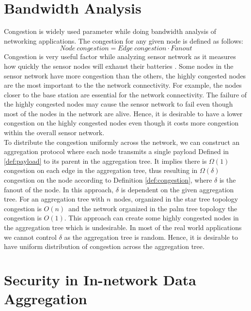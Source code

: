 \section{Bandwidth Analysis}
	Congestion is widely used parameter while doing bandwidth analysis of networking applications. 
	The congestion for any given node is defined as follows:
	\begin{equation}\label{def:congestion}
		Node\ congestion = Edge\ congestion \cdot Fanout
	\end{equation}
	Congestion is very useful factor while analyzing sensor network as it measures how quickly the sensor nodes will exhaust their batteries \cite{madden2003design}. 
	Some nodes in the sensor network have more congestion than the others, the highly congested nodes are the most important to the the network connectivity.
	For example, the nodes closer to the base station are essential for the network connectivity.
	The failure of the highly congested nodes may cause the sensor network to fail even though most of the nodes in the network are alive.
	Hence, it is desirable to have a lower congestion on the highly congested nodes even though it costs more congestion within the overall sensor network.\\
	To distribute the congestion uniformly across the network, we can construct an aggregation protocol where each node transmits a single payload Defined in \ref{def:payload} to its parent in the aggregation tree.
	It implies there is $\Omega(1)$ congestion on each edge in the aggregation tree, thus resulting in $\Omega(\delta)$ congestion on the node  according to Definition \ref{def:congestion}, where $\delta$ is the fanout of the node.
	In this approach, $\delta$ is dependent on the given aggregation tree.
	For an aggregation tree with $n$\ nodes, organized in the star tree topology congestion is $O(n)$\ and the network organized in the palm tree topology the congestion is $O(1)$.
	This approach can create some highly congested nodes in the aggregation tree which is undesirable.
	In most of the real world applications we cannot control $\delta$ as the aggregation tree is random.
	Hence, it is desirable to have uniform distribution of congestion across the aggregation tree.



\section{Security in In-network Data Aggregation}
	\label{sec:aggregate-adversary}

